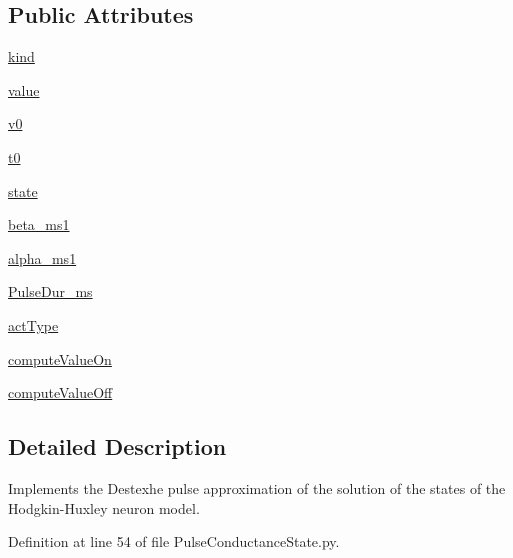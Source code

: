 \subsection*{Public Attributes}
\begin{DoxyCompactItemize}
\item 
\hyperlink{class_pulse_conductance_state_1_1_pulse_conductance_state_a53d237daaa4815ad375e2377da89845e}{kind}
\item 
\hyperlink{class_pulse_conductance_state_1_1_pulse_conductance_state_a832cdff7f315b8c16bef00642fb385dd}{value}
\item 
\hyperlink{class_pulse_conductance_state_1_1_pulse_conductance_state_a215539a3eb60e280225053c83f386d79}{v0}
\item 
\hyperlink{class_pulse_conductance_state_1_1_pulse_conductance_state_a55f44caf230fc3899811924118705f56}{t0}
\item 
\hyperlink{class_pulse_conductance_state_1_1_pulse_conductance_state_ac85aa714a187088e1b31fa2369ed4bca}{state}
\item 
\hyperlink{class_pulse_conductance_state_1_1_pulse_conductance_state_a8ebc0c29d97fa09699d7dfb724e94f82}{beta\-\_\-ms1}
\item 
\hyperlink{class_pulse_conductance_state_1_1_pulse_conductance_state_a5fe4e2c9035df43a1e8eb9d66d669e14}{alpha\-\_\-ms1}
\item 
\hyperlink{class_pulse_conductance_state_1_1_pulse_conductance_state_afda03b180fc3cb619de615632e725a6f}{Pulse\-Dur\-\_\-ms}
\item 
\hyperlink{class_pulse_conductance_state_1_1_pulse_conductance_state_a0677d7b972a6f6a12abc666212a12297}{act\-Type}
\item 
\hyperlink{class_pulse_conductance_state_1_1_pulse_conductance_state_a7f6710b9f97ac5879888402cd5ed15d4}{compute\-Value\-On}
\item 
\hyperlink{class_pulse_conductance_state_1_1_pulse_conductance_state_a89e0cc154bd699aee7529574a8fe556c}{compute\-Value\-Off}
\end{DoxyCompactItemize}


\subsection{Detailed Description}
Implements the Destexhe pulse approximation of the solution of the states of the Hodgkin-\/\-Huxley neuron model. 

Definition at line 54 of file Pulse\-Conductance\-State.\-py.



